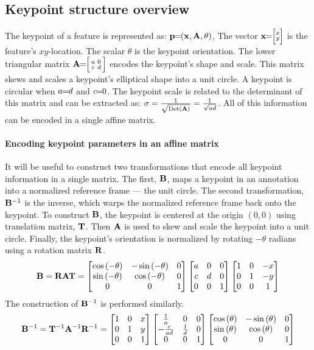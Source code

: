         \SceneryMatch{}

        \fgweight{}

    \subsection{Keypoint structure overview}\label{sec:kpstructure}
        The keypoint of a feature is represented as: $\mathbf{p}\mkern-6mu=\mkern-6mu(\mathbf{x}, \mathbf{A}, \theta)$, %
        The vector $\mathbf{x}\mkern-6mu=\mkern-6mu \Bigl[\negthinspace \begin{smallmatrix}  x\\ y \end{smallmatrix} \negthinspace \Bigr] $ is the feature's $xy$-location. The scalar $\theta$ is the keypoint
        orientation. The lower triangular matrix $\mathbf{A}\mkern-6mu=\mkern-6mu \Bigl[ \begin{smallmatrix} a & 0\\c & d \end{smallmatrix} \Bigr] $ encodes the keypoint's shape and scale.
        This matrix skews and scales a keypoint's elliptical shape into a unit circle. A keypoint is circular when
        $a\mkern-6mu=\mkern-6mu{}d$ and $c\mkern-6mu=\mkern-6mu0$.
        The keypoint scale is related to the determinant of this matrix and can be extracted as: %
        $\sigma = \frac{1}{\sqrt{\mathbin{\textrm{Det}}\left(\mathbf{A}\right)}} = \frac{1}{\sqrt{ad}}$. All of this information can be encoded in
        a single affine matrix.

        \paragraph{Encoding keypoint parameters in an affine matrix}
        It will be useful to construct two transformations that encode all keypoint information in a single matrix.
        The first, $\mathbf{B}$, maps a keypoint in an annotation into a normalized reference frame --- the unit
        circle. The second transformation, $\mathbf{B}^{-1}$ is the inverse, which warps the normalized reference
        frame back onto the keypoint. To construct $\mathbf{B}$, the keypoint is centered at the origin $(0, 0)$ using
        translation matrix, $\mathbf{T}$. Then $\mathbf{A}$ is used to skew and scale the keypoint into a unit circle.
        Finally, the keypoint's orientation is normalized by rotating $-\theta$ radians using a rotation matrix
        $\mathbf{R}$.
        \begin{equation}\label{eqn:RVTConstruct}
            \mathbf{B}=\mathbf{R} \mathbf{A} \mathbf{T} =  \left[ \begin{matrix}  \cos{\left(-\theta\right)} & -\sin{\left(-\theta\right)} & 0\\ \sin{\left(-\theta\right)} & \cos{\left(-\theta\right)} & 0\\ 0 & 0 & 1  \end{matrix} \right]   \left[ \begin{matrix} a & 0 & 0\\c & d & 0 \\ 0 & 0 & 1 \end{matrix} \right]   \left[ \begin{matrix}  1 & 0 & -x\\ 0 & 1 & -y\\ 0 & 0 & 1  \end{matrix} \right] 
        \end{equation}
        The construction of $\mathbf{B}^{-1}$ is performed similarly.
        \begin{equation}\label{eqn:invTVRConstruct}
             \mathbf{B}^{-1} = \mathbf{T}^{-1} \mathbf{A}^{-1} \mathbf{R}^{-1} = 
              \left[ \begin{matrix}  1 & 0 & x\\ 0 & 1 & y\\ 0 & 0 & 1  \end{matrix} \right] 
              \left[ \begin{matrix} 
                \frac{1}{a}     & 0               & 0\\
                -\frac{c}{a d}  & \frac{1}{d}     & 0\\
                0               & 0               & 1
                 \end{matrix} \right] 
              \left[ \begin{matrix}  \cos{\left(\theta\right)} & -\sin{\left(\theta\right)} & 0\\ \sin{\left(\theta\right)} & \cos{\left(\theta\right)} & 0\\ 0 & 0 & 1  \end{matrix} \right] 
        \end{equation}


